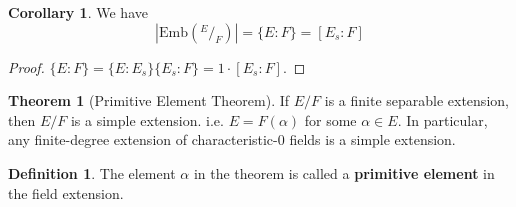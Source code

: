 \documentclass[12pt]{article}
\theoremstyle{definition}
\newtheorem{thm}{Theorem}
\newtheorem{dfn}{Definition}
\newtheorem{cor}{Corollary}
\newcommand*\quot[2]{{^{\textstyle #1}\big/_{\textstyle #2}}}
\begin{document}
\begin{cor}
	We have
	\[
		\left|\text{Emb}(\quot{E}{F})\right| = \{E:F\} = [E_s:F]
	\]
\end{cor}

\begin{proof}
	$\{E:F\} = \{E:E_s\}\{E_s:F\} = 1 \cdot [E_s:F]$.
\end{proof}

\begin{thm}[Primitive Element Theorem]
	If $E/F$ is a finite separable extension, then $E/F$ is a simple extension.
	i.e. $E = F(\alpha)$ for some $\alpha \in E$.
	In particular, any finite-degree extension of characteristic-0 fields is a simple extension.
\end{thm}

\begin{dfn}
	The element $\alpha$ in the theorem is called a \textbf{primitive element} in the field extension.
\end{dfn}
\end{document}
